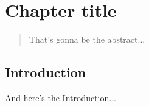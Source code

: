 

\renewcommand{\chapterauthor}{Write your name here}
\chapter{Chapter title}
\label{studentxx:report}

\begin{abstract}

That's gonna be the abstract...

\end{abstract}


\section{Introduction}

And here's the Introduction...



